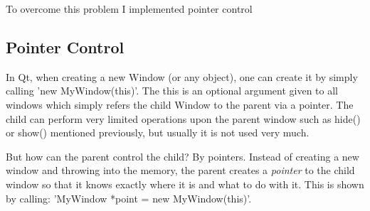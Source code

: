 \documentclass[11pt]{article} %
\begin{document}
To overcome this problem I implemented pointer control
\subsection{Pointer Control}
In Qt, when creating a new Window (or any object), one can create it by simply calling 'new MyWindow(this)'. The this is an optional argument given to all windows which simply refers the child Window to the parent via a pointer. The child can perform very limited operations upon the parent window such as hide() or show() mentioned previously, but usually it is not used very much.

But how can the parent control the child? By pointers. Instead of creating a new window and throwing into the memory, the parent creates a {\it pointer} to the child window so that it knows exactly where it is and what to do with it. This is shown by calling:
'MyWindow *point = new MyWindow(this)'.
\end{document}
